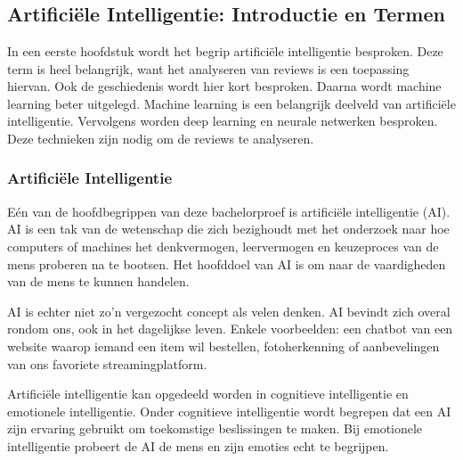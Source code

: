 \chapter{}
\label{ch:stand-van-zaken}




\section{Artificiële Intelligentie: Introductie en Termen}
\label{sec:artificiëleintelligentieintroductie}
In een eerste hoofdstuk wordt het begrip artificiële intelligentie besproken. Deze term is heel belangrijk, want het analyseren van reviews is een toepassing hiervan. Ook de geschiedenis wordt hier kort besproken. Daarna wordt machine learning beter uitgelegd. Machine learning is een belangrijk deelveld van artificiële intelligentie. Vervolgens worden deep learning en neurale netwerken besproken. Deze technieken zijn nodig om de reviews te analyseren. 

\subsection{Artificiële Intelligentie}
\label{sec:artificiëleintelligentie}
Eén van de hoofdbegrippen van deze bachelorproef is artificiële intelligentie (AI). \gls{AI} is een tak van de wetenschap die zich bezighoudt met het onderzoek naar hoe computers of machines het denkvermogen, leervermogen en keuzeproces van de mens proberen na te bootsen. Het hoofddoel van AI is om naar de vaardigheden van de mens te kunnen handelen. \autocite{IBM2021}

AI is echter niet zo'n vergezocht concept als velen denken. AI bevindt zich overal rondom ons, ook in het dagelijkse leven. Enkele voorbeelden: een chatbot van een website waarop iemand een item wil bestellen, fotoherkenning of aanbevelingen van ons favoriete streamingplatform. \autocite{IBM2021}

Artificiële intelligentie kan opgedeeld worden in cognitieve intelligentie en emotionele intelligentie. Onder cognitieve intelligentie wordt begrepen dat een AI zijn ervaring gebruikt om toekomstige beslissingen te maken. Bij emotionele intelligentie probeert de AI de mens en zijn emoties echt te begrijpen. \autocite{Andreas2018}

